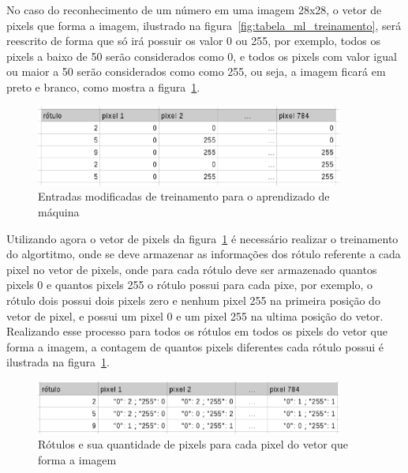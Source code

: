 No caso do reconhecimento de um número em uma imagem 28x28, o vetor de pixels
que forma a imagem, ilustrado na figura~\ref{fig:tabela_ml_treinamento}, será
reescrito de forma que só irá possuir os valor 0 ou 255, por exemplo, todos os
pixels a baixo de 50 serão considerados como 0, e todos os pixels com valor igual
ou maior a 50 serão considerados como como 255, ou seja, a imagem ficará em preto
e branco, como mostra a figura~\ref{fig:tabela_ml_treinamento_convertida}.

\begin{figure}[h]
  \centering
  \includegraphics[width=0.9\textwidth]{figuras/tabela_ml_treinamento_convertida.eps}
  \caption{Entradas modificadas de treinamento para o aprendizado de máquina}
  \label{fig:tabela_ml_treinamento_convertida}
\end{figure}

Utilizando agora o vetor de pixels da figura~\ref{fig:tabela_ml_treinamento_convertida}
é necessário realizar o treinamento do algortitmo, onde se deve armazenar as informações
dos rótulo referente a cada pixel no vetor de pixels, onde para cada rótulo deve ser
armazenado quantos pixels 0 e quantos pixels 255 o rótulo possui para cada pixe, por
exemplo, o rótulo dois possui dois pixels zero e nenhum pixel 255 na primeira posição do
vetor de pixel, e possui um pixel 0 e um pixel 255 na ultima posição do vetor. Realizando
esse processo para todos os rótulos em todos os pixels do vetor que forma a imagem, a
contagem de quantos pixels diferentes cada rótulo possui é ilustrada na
figura~\ref{fig:tabela_ml_treinamento_convertida}.

\begin{figure}[h]
  \centering
  \includegraphics[width=0.9\textwidth]{figuras/rotulos_e_pixels.eps}
  \caption{Rótulos e sua quantidade de pixels para cada pixel do vetor que forma a imagem}
  \label{fig:rotulos_e_pixels}
\end{figure}

